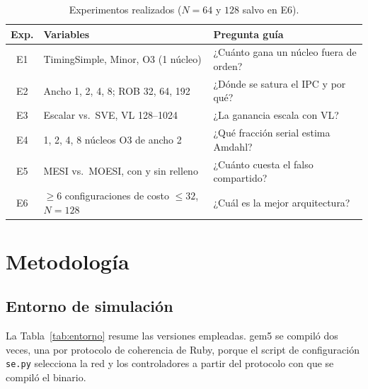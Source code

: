 \documentclass[journal]{IEEEtran}
\begin{document}
\begin{table}[h]
\centering
\caption{Experimentos realizados ($N = 64$ y $128$ salvo en E6).}
\label{tab:experimentos}
\footnotesize
\setlength{\tabcolsep}{3pt}
\begin{tabular}{|c|p{3.1cm}|p{3.6cm}|}
\hline
\textbf{Exp.} & \textbf{Variables} & \textbf{Pregunta guía} \\ \hline
E1 & TimingSimple, Minor, O3 (1 núcleo) & ¿Cuánto gana un núcleo fuera de orden? \\ \hline
E2 & Ancho 1, 2, 4, 8; ROB 32, 64, 192 & ¿Dónde se satura el IPC y por qué? \\ \hline
E3 & Escalar vs.\ SVE, VL 128--1024 & ¿La ganancia escala con VL? \\ \hline
E4 & 1, 2, 4, 8 núcleos O3 de ancho 2 & ¿Qué fracción serial estima Amdahl? \\ \hline
E5 & MESI vs.\ MOESI, con y sin relleno & ¿Cuánto cuesta el falso compartido? \\ \hline
E6 & $\ge 6$ configuraciones de costo $\le 32$, $N=128$ & ¿Cuál es la mejor arquitectura? \\ \hline
\end{tabular}
\end{table}

\section{Metodología}
\label{sec:metodologia}

\subsection{Entorno de simulación}

La Tabla~\ref{tab:entorno} resume las versiones empleadas. gem5 se
compiló dos veces, una por protocolo de coherencia de Ruby, porque el
script de configuración \texttt{se.py} selecciona la red y los
controladores a partir del protocolo con que se compiló el binario.
\end{document}

